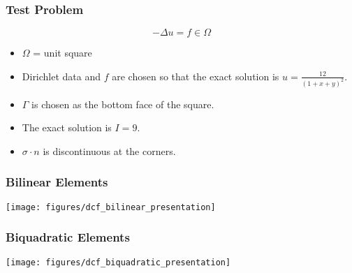 \begin{frame}
  \frametitle{Test Problem}
  \begin{equation}
    \nonumber
    -\Delta u = f \in \Omega
  \end{equation}
  \begin{itemize}
  \item{$\Omega$ = unit square}
  \item{Dirichlet data and $f$ are chosen so that the exact solution is $u=\frac{12}{(1+x+y)^2}$.}
  \item{$\Gamma$ is chosen as the bottom face of the square.}
  \item{The exact solution is $I=9$.}
  \item{$\sigma \cdot n$ is discontinuous at the corners.}
  \end{itemize}
\end{frame}

\begin{frame}
  \frametitle{Bilinear Elements}
  \vspace{-.25in}
  \begin{center}
    \texttt{[image: figures/dcf\_bilinear\_presentation]}    
  \end{center}
\end{frame}

\begin{frame}
  \frametitle{Biquadratic Elements}
  \vspace{-.25in}
  \begin{center}
    \texttt{[image: figures/dcf\_biquadratic\_presentation]}    
  \end{center}
\end{frame}
